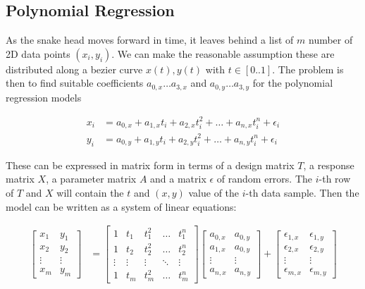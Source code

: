 \subsection{Polynomial Regression}
\label{sec:polynomial-regression}

As the snake head moves forward in time, it leaves behind a list of $m$ number of 2D data points $(x_i,y_i)$. We can make the reasonable assumption these are distributed along a bezier curve $x(t),y(t)$ with $t\in[0..1]$. The problem is then to find suitable coefficients $a_{0,x} \ldots a_{3,x}$ and $a_{0,y} \ldots a_{3,y}$ for the polynomial regression models

\begin{align}
    x_i &= a_{0,x} + a_{1,x} t_i + a_{2,x} t_i^2 + \ldots + a_{n,x} t_i^n + \epsilon_i \\
    y_i &= a_{0,y} + a_{1,y} t_i + a_{2,y} t_i^2 + \ldots + a_{n,y} t_i^n + \epsilon_i
    \label{eq:regression-models}
\end{align}

These can be expressed in matrix form in terms of a design matrix $T$, a response matrix $X$, a parameter matrix $A$ and a matrix $\epsilon$ of random errors. The $i$-th row of $T$ and $X$ will contain the $t$ and $(x,y)$ value of the $i$-th data sample. Then the model can be written as a system of linear equations:

\begin{align}
    \begin{bmatrix}
        x_1 & y_1 \\ x_2 & y_2 \\ \vdots & \vdots \\ x_m & y_m
    \end{bmatrix}
    &=
    \begin{bmatrix}
        1      & t_1     & t_1^2     & \ldots & t_1^n \\
        1      & t_2     & t_2^2     & \ldots & t_2^n \\
        \vdots & \vdots  & \vdots    & \ddots & \vdots \\
        1      & t_m     & t_m^2     & \ldots & t_m^n
    \end{bmatrix}
    \begin{bmatrix}
        a_{0,x} & a_{0,y} \\
        a_{1,x} & a_{0,y} \\
        \vdots  & \vdots \\
        a_{n,x} & a_{n,y}
    \end{bmatrix}
    +
    \begin{bmatrix}
        \epsilon_{1,x} & \epsilon_{1,y} \\
        \epsilon_{2,x} & \epsilon_{2,y} \\
        \vdots         & \vdots \\
        \epsilon_{m,x} & \epsilon_{m,y}
    \end{bmatrix}
    \label{eq:regression-model}
\end{align}

